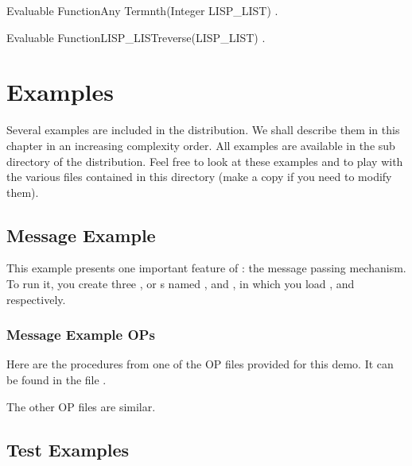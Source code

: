 \begin{typeefa}{Evaluable Function}{Any Term}{nth}{(Integer LISP\_LIST)}
.
\end{typeefa}

\begin{typeefa}{Evaluable Function}{LISP\_LIST}{reverse}{(LISP\_LIST)}
.
\end{typeefa}


\chapter{Examples}

Several examples are included in the \COPRS{} distribution.  We shall describe
them in this chapter in an increasing complexity order. All examples are
available in the  sub directory of the \COPRSDE{} distribution. Feel
free to look at these examples and to play with the various files contained in
this directory (make a copy if you need to modify them).



\section{Message Example}

This example presents one important feature of \COPRS: the message
passing mechanism. To run it, you create three \COPRS{}, or \XPK{}s named
,  and , in which you load
,  and 
respectively.



\subsection{Message Example OPs}

Here are the procedures from one of the OP files provided for this demo.  It
can be found in the file .



The other OP files are similar.

\section{Test Examples}

